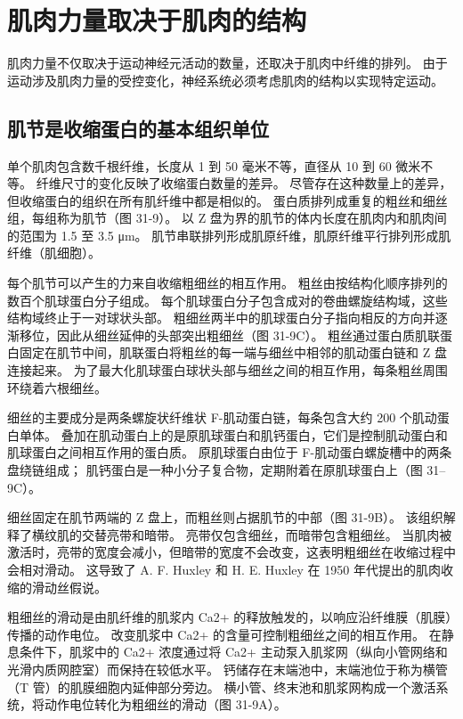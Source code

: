 \section{肌肉力量取决于肌肉的结构}
肌肉力量不仅取决于运动神经元活动的数量，还取决于肌肉中纤维的排列。 由于运动涉及肌肉力量的受控变化，神经系统必须考虑肌肉的结构以实现特定运动。

\subsection{肌节是收缩蛋白的基本组织单位}
单个肌肉包含数千根纤维，长度从 1 到 50 毫米不等，直径从 10 到 60 微米不等。 纤维尺寸的变化反映了收缩蛋白数量的差异。 尽管存在这种数量上的差异，但收缩蛋白的组织在所有肌纤维中都是相似的。 蛋白质排列成重复的粗丝和细丝组，每组称为肌节（图 31-9）。 以 Z 盘为界的肌节的体内长度在肌肉内和肌肉间的范围为 1.5 至 3.5 μm。 肌节串联排列形成肌原纤维，肌原纤维平行排列形成肌纤维（肌细胞）。

每个肌节可以产生的力来自收缩粗细丝的相互作用。 粗丝由按结构化顺序排列的数百个肌球蛋白分子组成。 每个肌球蛋白分子包含成对的卷曲螺旋结构域，这些结构域终止于一对球状头部。 粗细丝两半中的肌球蛋白分子指向相反的方向并逐渐移位，因此从细丝延伸的头部突出粗细丝（图 31-9C）。 粗丝通过蛋白质肌联蛋白固定在肌节中间，肌联蛋白将粗丝的每一端与细丝中相邻的肌动蛋白链和 Z 盘连接起来。 为了最大化肌球蛋白球状头部与细丝之间的相互作用，每条粗丝周围环绕着六根细丝。

细丝的主要成分是两条螺旋状纤维状 F-肌动蛋白链，每条包含大约 200 个肌动蛋白单体。 叠加在肌动蛋白上的是原肌球蛋白和肌钙蛋白，它们是控制肌动蛋白和肌球蛋白之间相互作用的蛋白质。 原肌球蛋白由位于 F-肌动蛋白螺旋槽中的两条盘绕链组成； 肌钙蛋白是一种小分子复合物，定期附着在原肌球蛋白上（图 31–9C）。

细丝固定在肌节两端的 Z 盘上，而粗丝则占据肌节的中部（图 31-9B）。 该组织解释了横纹肌的交替亮带和暗带。 亮带仅包含细丝，而暗带包含粗细丝。 当肌肉被激活时，亮带的宽度会减小，但暗带的宽度不会改变，这表明粗细丝在收缩过程中会相对滑动。 这导致了 A. F. Huxley 和 H. E. Huxley 在 1950 年代提出的肌肉收缩的滑动丝假说。

粗细丝的滑动是由肌纤维的肌浆内 Ca2+ 的释放触发的，以响应沿纤维膜（肌膜）传播的动作电位。 改变肌浆中 Ca2+ 的含量可控制粗细丝之间的相互作用。 在静息条件下，肌浆中的 Ca2+ 浓度通过将 Ca2+ 主动泵入肌浆网（纵向小管网络和光滑内质网腔室）而保持在较低水平。 钙储存在末端池中，末端池位于称为横管（T 管）的肌膜细胞内延伸部分旁边。 横小管、终末池和肌浆网构成一个激活系统，将动作电位转化为粗细丝的滑动（图 31-9A）。

